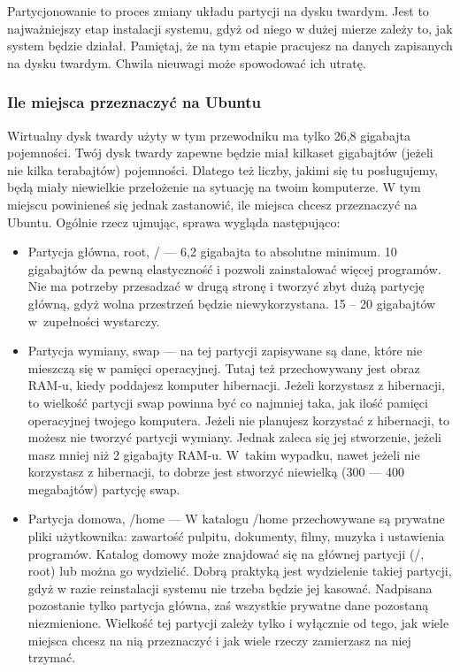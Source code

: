 \label{subsec:partycjonowanie}
Partycjonowanie to proces zmiany układu partycji na dysku twardym. Jest to najważniejszy etap instalacji systemu, gdyż od niego w dużej mierze zależy to, jak system będzie działał. Pamiętaj, że na tym etapie pracujesz na danych zapisanych na dysku twardym. Chwila nieuwagi może spowodować ich utratę.
\subsubsection{Ile miejsca przeznaczyć na Ubuntu}
\label{ile_miejsca}
Wirtualny dysk twardy użyty w tym przewodniku ma tylko 26,8 gigabajta pojemności. Twój dysk twardy zapewne będzie miał kilkaset gigabajtów (jeżeli nie kilka terabajtów) pojemności. Dlatego też liczby, jakimi się tu posługujemy, będą miały niewielkie przełożenie na sytuację na twoim komputerze. W tym miejscu powinieneś się jednak zastanowić, ile miejsca chcesz przeznaczyć na Ubuntu.
Ogólnie rzecz ujmując, sprawa wygląda następująco:
\begin{itemize}
\item \textcolor{ubuntu_orange}{Partycja główna, root, /} --- 6,2 gigabajta to absolutne minimum. 10 gigabajtów da pewną elastyczność i pozwoli zainstalować więcej programów. Nie ma potrzeby przesadzać w drugą stronę i tworzyć zbyt dużą partycję główną, gdyż wolna przestrzeń będzie niewykorzystana. 15 -- 20 gigabajtów w~zupełności wystarczy.
\item \textcolor{ubuntu_orange}{Partycja wymiany, swap} --- na tej partycji zapisywane są dane, które nie mieszczą się w pamięci operacyjnej. Tutaj też przechowywany jest obraz RAM-u, kiedy poddajesz komputer hibernacji. Jeżeli korzystasz z hibernacji, to wielkość partycji swap powinna być co najmniej taka, jak ilość pamięci operacyjnej twojego komputera. Jeżeli nie planujesz korzystać z hibernacji, to możesz nie tworzyć partycji wymiany. Jednak zaleca się jej stworzenie, jeżeli masz mniej niż 2 gigabajty RAM-u. W~takim wypadku, nawet jeżeli nie korzystasz z hibernacji, to dobrze jest stworzyć niewielką (300 --- 400 megabajtów) partycję swap.
\item \textcolor{ubuntu_orange}{Partycja domowa, /home} --- W katalogu /home przechowywane są prywatne pliki użytkownika: zawartość pulpitu, dokumenty, filmy, muzyka i ustawienia programów. Katalog domowy może znajdować się na głównej partycji (/, root) lub można go wydzielić. Dobrą praktyką jest wydzielenie takiej partycji, gdyż w razie reinstalacji systemu nie trzeba będzie jej kasować. Nadpisana pozostanie tylko partycja główna, zaś wszystkie prywatne dane pozostaną niezmienione. Wielkość tej partycji zależy tylko i wyłącznie od tego, jak wiele miejsca chcesz na nią przeznaczyć i jak wiele rzeczy zamierzasz na niej trzymać. 
\end{itemize}
\clearpage
